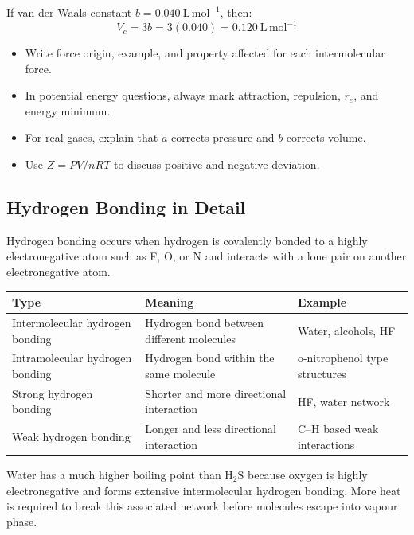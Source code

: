 \documentclass[12pt,a4paper]{article}
\begin{document}
\begin{tcolorbox}[examplebox, title={Solved Example: Critical Volume}]
If van der Waals constant $b=0.040\ \mathrm{L\,mol^{-1}}$, then:
\[
V_c=3b=3(0.040)=0.120\ \mathrm{L\,mol^{-1}}
\]
\end{tcolorbox}

\begin{tcolorbox}[masonbox, title={How to Score in This Module}]
\begin{itemize}[leftmargin=*, itemsep=2pt, topsep=2pt]
  \item Write force origin, example, and property affected for each intermolecular force.
  \item In potential energy questions, always mark attraction, repulsion, $r_e$, and energy minimum.
  \item For real gases, explain that $a$ corrects pressure and $b$ corrects volume.
  \item Use $Z=PV/nRT$ to discuss positive and negative deviation.
\end{itemize}
\end{tcolorbox}

\subsection{Hydrogen Bonding in Detail}
Hydrogen bonding occurs when hydrogen is covalently bonded to a highly electronegative atom such as F, O, or N and interacts with a lone pair on another electronegative atom.

\begin{tabularx}{\linewidth}{|B{3.3cm}|Y|Y|}
\hline
\textbf{Type} & \textbf{Meaning} & \textbf{Example} \\
\hline
Intermolecular hydrogen bonding & Hydrogen bond between different molecules & Water, alcohols, HF \\
\hline
Intramolecular hydrogen bonding & Hydrogen bond within the same molecule & o-nitrophenol type structures \\
\hline
Strong hydrogen bonding & Shorter and more directional interaction & HF, water network \\
\hline
Weak hydrogen bonding & Longer and less directional interaction & C--H based weak interactions \\
\hline
\end{tabularx}

\begin{tcolorbox}[examplebox, title={Exam Explanation: Boiling Point of Water}]
Water has a much higher boiling point than $\mathrm{H_2S}$ because oxygen is highly electronegative and forms extensive intermolecular hydrogen bonding. More heat is required to break this associated network before molecules escape into vapour phase.
\end{tcolorbox}
\end{document}
